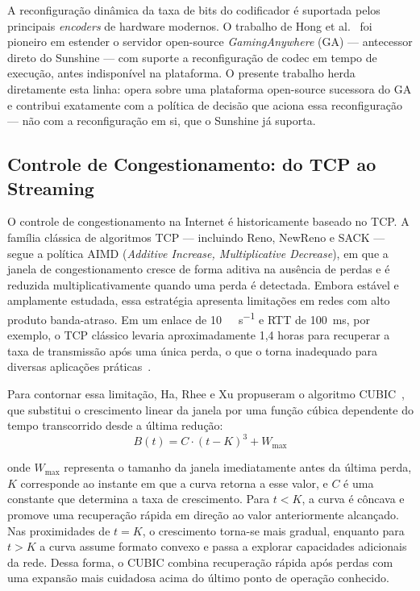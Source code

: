 \documentclass[conference]{IEEEtran}
\begin{document}
A reconfiguração dinâmica da taxa de bits do codificador é
suportada pelos principais \emph{encoders} de hardware modernos. O trabalho de Hong et al.~\cite{hong2015}
foi pioneiro em estender o servidor open-source
\emph{GamingAnywhere} (GA) — antecessor direto do Sunshine — com
suporte a reconfiguração de codec em tempo de execução, antes
indisponível na plataforma. O presente trabalho herda
diretamente esta linha: opera sobre uma plataforma open-source
sucessora do GA e contribui exatamente com a política de decisão
que aciona essa reconfiguração — não com a reconfiguração em si,
que o Sunshine já suporta.

\subsection{Controle de Congestionamento: do TCP ao Streaming}

O controle de congestionamento na Internet é historicamente baseado no TCP. A família clássica de algoritmos TCP --- incluindo Reno, NewReno e SACK --- segue a política AIMD (\emph{Additive Increase, Multiplicative Decrease}), em que a janela de congestionamento cresce de forma aditiva na ausência de perdas e é reduzida multiplicativamente quando uma perda é detectada. Embora estável e amplamente estudada, essa estratégia apresenta limitações em redes com alto produto banda-atraso. Em um enlace de \SI{10}{\giga\bit\per\second} e RTT de \SI{100}{\milli\second}, por exemplo, o TCP clássico levaria aproximadamente 1,4 horas para recuperar a taxa de transmissão após uma única perda, o que o torna inadequado para diversas aplicações práticas~\cite{cubic}.

Para contornar essa limitação, Ha, Rhee e Xu propuseram o algoritmo CUBIC~\cite{cubic}, que substitui o crescimento linear da janela por uma função cúbica dependente do tempo transcorrido desde a última redução:
\begin{equation}
B(t) = C \cdot (t - K)^3 + W_{\max}
\label{eq:cubic}
\end{equation}

onde $W_{\max}$ representa o tamanho da janela imediatamente antes da última perda, $K$ corresponde ao instante em que a curva retorna a esse valor, e $C$ é uma constante que determina a taxa de crescimento. Para $t < K$, a curva é côncava e promove uma recuperação rápida em direção ao valor anteriormente alcançado. Nas proximidades de $t = K$, o crescimento torna-se mais gradual, enquanto para $t > K$ a curva assume formato convexo e passa a explorar capacidades adicionais da rede. Dessa forma, o CUBIC combina recuperação rápida após perdas com uma expansão mais cuidadosa acima do último ponto de operação conhecido.
\end{document}
